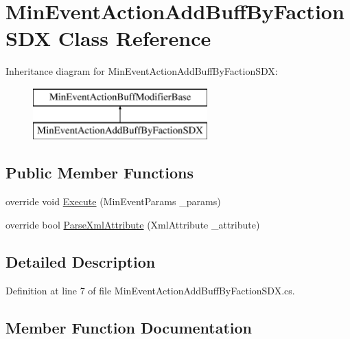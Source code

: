 \hypertarget{class_min_event_action_add_buff_by_faction_s_d_x}{}\section{Min\+Event\+Action\+Add\+Buff\+By\+Faction\+S\+DX Class Reference}
\label{class_min_event_action_add_buff_by_faction_s_d_x}
Inheritance diagram for Min\+Event\+Action\+Add\+Buff\+By\+Faction\+S\+DX\+:\begin{figure}[H]
\begin{center}
\leavevmode
\includegraphics[height=2.000000cm]{d4/d84/class_min_event_action_add_buff_by_faction_s_d_x}
\end{center}
\end{figure}
\subsection*{Public Member Functions}
\begin{DoxyCompactItemize}
\item 
override void \mbox{\hyperlink{class_min_event_action_add_buff_by_faction_s_d_x_a8f88ecf0237613ee91f5d5b0b7f0c0ba}{Execute}} (Min\+Event\+Params \+\_\+params)
\item 
override bool \mbox{\hyperlink{class_min_event_action_add_buff_by_faction_s_d_x_af685f41dd43f9385c06a94bb68ce45a0}{Parse\+Xml\+Attribute}} (Xml\+Attribute \+\_\+attribute)
\end{DoxyCompactItemize}


\subsection{Detailed Description}


Definition at line 7 of file Min\+Event\+Action\+Add\+Buff\+By\+Faction\+S\+D\+X.\+cs.



\subsection{Member Function Documentation}
\mbox{\label{class_min_event_action_add_buff_by_faction_s_d_x_a8f88ecf0237613ee91f5d5b0b7f0c0ba}} 
